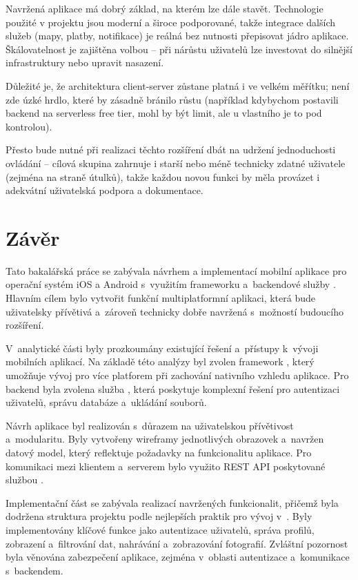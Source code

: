 \documentclass[czech, bp, kiv, he, iso690numb, pdf]{fasthesis}
\begin{document}
    Navržená aplikace má dobrý základ, na kterém lze dále stavět. Technologie použité v projektu jsou moderní a široce podporované, takže integrace dalších služeb (mapy, platby, notifikace) je reálná bez nutnosti přepisovat jádro aplikace. Škálovatelnost je zajištěna volbou  – při nárůstu uživatelů lze investovat do silnější infrastruktury nebo upravit nasazení.

    Důležité je, že architektura client-server zůstane platná i ve velkém měřítku; není zde úzké hrdlo, které by zásadně bránilo růstu (například kdybychom postavili backend na serverless free tier, mohl by být limit, ale u vlastního  je to pod kontrolou).

    Přesto bude nutné při realizaci těchto rozšíření dbát na udržení jednoduchosti ovládání – cílová skupina zahrnuje i starší nebo méně technicky zdatné uživatele (zejména na straně útulků), takže každou novou funkci by měla provázet i adekvátní uživatelská podpora a dokumentace.





    \chapter{Závěr}

    Tato bakalářská práce se zabývala návrhem a implementací mobilní aplikace pro operační systém iOS a Android s~využitím frameworku  a~backendové služby . Hlavním cílem bylo vytvořit funkční multiplatformní aplikaci, která bude uživatelsky přívětivá a~zároveň technicky dobře navržená s~možností budoucího rozšíření.

    V~analytické části byly prozkoumány existující řešení a~přístupy k~vývoji mobilních aplikací. Na základě této analýzy byl zvolen framework , který umožňuje vývoj pro více platforem při zachování nativního vzhledu aplikace. Pro backend byla zvolena služba , která poskytuje komplexní řešení pro autentizaci uživatelů, správu databáze a~ukládání souborů.

    Návrh aplikace byl realizován s~důrazem na uživatelskou přívětivost a~modularitu. Byly vytvořeny wireframy jednotlivých obrazovek a~navržen datový model, který reflektuje požadavky na funkcionalitu aplikace. Pro komunikaci mezi klientem a~serverem bylo využito REST API poskytované službou .

    Implementační část se zabývala realizací navržených funkcionalit, přičemž byla dodržena struktura projektu podle nejlepších praktik pro vývoj v~. Byly implementovány klíčové funkce jako autentizace uživatelů, správa profilů, zobrazení a~filtrování dat, nahrávání a~zobrazování fotografií. Zvláštní pozornost byla věnována zabezpečení aplikace, zejména v~oblasti autentizace a~komunikace s~backendem.
\end{document}
